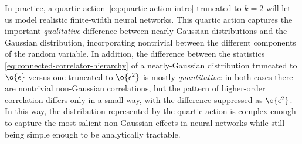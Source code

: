 In practice, a quartic action~\eqref{eq:quartic-action-intro} truncated to $k=2$  will let us model realistic finite-width neural networks.
This quartic action captures the important \emph{qualitative} difference between nearly-Gaussian distributions and the Gaussian distribution, incorporating nontrivial  between the different components of the random variable.
In addition, the difference between the statistics \eqref{eq:connected-correlator-hierarchy} of a nearly-Gaussian distribution truncated to $\o{\epsilon}$ versus one truncated to $\o{\epsilon^2}$ is mostly \emph{quantitative}: in both cases there are nontrivial non-Gaussian correlations, but the pattern of higher-order correlation differs only in a small way, with the difference suppressed as $\o{\epsilon^2}$.
In this way, the distribution represented by the quartic action is complex enough to capture the most salient non-Gaussian effects in neural networks while still being simple enough to be analytically tractable. 



























